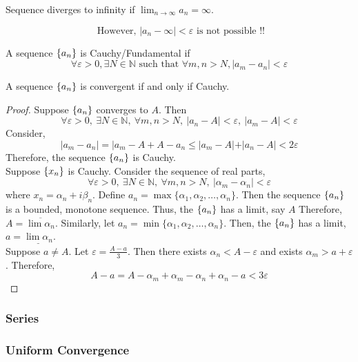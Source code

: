 \begin{remark}
	Sequence diverges to infinity if $\displaystyle \lim_{n \to \infty} a_n = \infty$.
\end{remark}
\[ \text{ However, } |a_n - \infty| < \varepsilon \text{ is not possible !!} \]

\begin{definition}[Cauchy]
	A sequence $\left\{a_n\right\}$ is Cauchy/Fundamental if \begin{equation}
		\forall \varepsilon > 0, \exists N \in \mathbb{N} \text{ such that } \forall m,n > N, |a_m-a_n| < \varepsilon
\end{equation}
\end{definition}

\begin{theorem}
	A sequence $\left\{a_n\right\}$ is convergent if and only if Cauchy.
\end{theorem}
\begin{proof}
	Suppose $\left\{a_n\right\}$ converges to $A$.
	Then \[\forall \varepsilon > 0,\ \exists N \in \mathbb{N},\ \forall m,n > N,\ |a_n - A| < \varepsilon,\ |a_m - A| < \varepsilon \]
	Consider,
	\[ |a_m - a_n| = |a_m - A + A - a_n \le |a_m - A| + |a_n - A| < 2\varepsilon \]
	Therefore, the sequence $\left\{a_n\right\}$ is Cauchy.\\

	Suppose $\left\{x_n\right\}$ is Cauchy.
	Consider the sequence of real parts,
	\[\forall \varepsilon > 0,\ \exists N \in \mathbb{N},\ \forall m,n > N,\ |\alpha_m-\alpha_n| < \varepsilon \]
	where $x_n = \alpha_n + i \beta_n$.
	Define $a_n = \max\{\alpha_1, \alpha_2, \dots, \alpha_n\}$.
	Then the sequence $\left\{a_n\right\}$ is a bounded, monotone sequence.
	Thus, the $\left\{a_n\right\}$ has a limit, say $A$
	Therefore, $A = \overline{\lim \alpha_n}$.
	Similarly, let $a_n = \min\{\alpha_1,\alpha_2,\dots,\alpha_n\}$.
	Then, the $\left\{a_n\right\}$ has a limit, $a = \underline{\lim \alpha_n}$. \\
	
	Suppose $a \ne A$.
	Let $\varepsilon = \frac{A-a}{3}$.
	Then there exists $\alpha_n < A-\varepsilon$ and exists $\alpha_m > a + \varepsilon$.
	Therefore, \[A-a = A - \alpha_m + \alpha_m - \alpha_n + \alpha_n - a < 3\varepsilon \]
\end{proof}
\subsubsection{Series}
\subsubsection{Uniform Convergence}
